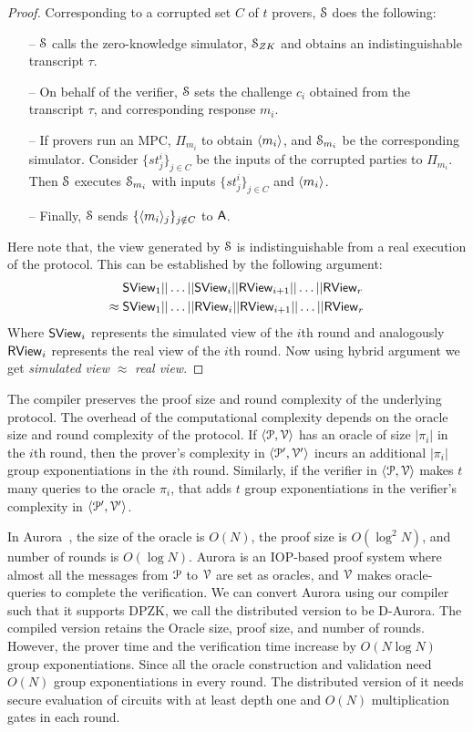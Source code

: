 \begin{proof}
	Corresponding to a corrupted set $C$ of $t$ provers, $\mathcal{S}$ does the following:
	\begin{itemize}
		\item[--] $\mathcal{S}$ calls the zero-knowledge simulator, $\mathcal{S}_{ZK}$ and obtains an indistinguishable transcript $\tau$.
		\item[--] On behalf of the verifier, $\mathcal{S}$ sets the challenge $c_i$ obtained from the transcript $\tau$, and corresponding response $m_i$.
		\item[--] If provers run an MPC, $\Pi_{m_i}$ to obtain $\langle m_i \rangle$, and $\mathcal{S}_{m_i}$ be the corresponding simulator. Consider $\{st^i_j\}_{j\in C}$ be the inputs of the corrupted parties to $\Pi_{m_i}$. Then $\mathcal{S}$ executes $\mathcal{S}_{m_i}$ with inputs $\{st^i_j\}_{j\in C}$ and $\langle m_i \rangle$.
		\item[--] Finally, $\mathcal{S}$ sends $\{\langle m_i \rangle_j\}_{j\notin C}$ to $\mathsf{A}$.
	\end{itemize}
	Here note that, the view generated by $\mathcal{S}$ is indistinguishable from a real execution of the protocol. This can be established by the following argument:
	\begin{align*}
	& \mathsf{S View}_1 || \ldots ||\mathsf{S View}_i || \mathsf{R View}_{i+1}|| \ldots || \mathsf{R View}_r \\
	\approx\; 
	& \mathsf{S View}_1 || \ldots ||\mathsf{R View}_i || \mathsf{R View}_{i+1}|| \ldots || \mathsf{R View}_r 
	\end{align*}
	Where $\mathsf{S View}_i$ represents the simulated view of the $i$th round and analogously $\mathsf{R View}_i$ represents the real view of the $i$th round.
	Now using hybrid argument we get \textit{simulated view} $\approx$ \textit{real view}.
\end{proof}
The compiler preserves the proof size and round complexity of the underlying protocol. The overhead of the computational complexity depends on the oracle size and round complexity of the protocol. If $\langle \mathcal{P}, \mathcal{V} \rangle$ has an oracle of size $|\pi_i|$ in the $i$th round, then the prover's complexity in $\langle \mathcal{P}', \mathcal{V}' \rangle$ incurs an additional $|\pi_i|$ group exponentiations in the $i$th round. Similarly, if the verifier in $\langle \mathcal{P}, \mathcal{V} \rangle$ makes $t$ many queries to the oracle $\pi_i$, that adds $t$ group exponentiations in the verifier's complexity in $\langle \mathcal{P}', \mathcal{V}' \rangle$.

In Aurora~\cite{aurora}, the size of the oracle is $O(N)$, the proof size is $O(\log^2 N)$, and number of rounds is $O(\log N)$. Aurora is an IOP-based proof system where almost all the messages from $\mathcal{P}$ to $\mathcal{V}$ are set as oracles, and $\mathcal{V}$ makes oracle-queries to complete the verification.
We can convert Aurora using our compiler such that it supports DPZK, we call the distributed version to be D-Aurora. The compiled version retains the Oracle size, proof size, and number of rounds. However, the prover time and the verification time increase by $O(N\log N)$ group exponentiations. Since all the oracle construction and validation need $O(N)$ group exponentiations in every round. The distributed version of it needs secure evaluation of circuits with at least depth one and $O(N)$ multiplication gates in each round.

